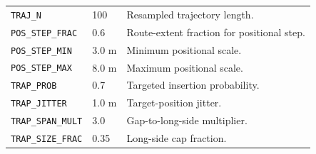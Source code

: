 \documentclass[11pt,a4paper]{report}
\newcommand{\code}[1]{\texttt{#1}}
\begin{document}
\begin{longtable}{L{4.3cm} L{2.4cm} L{7.8cm}}
\code{TRAJ\_N} & 100 & Resampled trajectory length.\\
\code{POS\_STEP\_FRAC} & 0.6 & Route-extent fraction for positional step.\\
\code{POS\_STEP\_MIN} & 3.0 m & Minimum positional scale.\\
\code{POS\_STEP\_MAX} & 8.0 m & Maximum positional scale.\\
\code{TRAP\_PROB} & 0.7 & Targeted insertion probability.\\
\code{TRAP\_JITTER} & 1.0 m & Target-position jitter.\\
\code{TRAP\_SPAN\_MULT} & 3.0 & Gap-to-long-side multiplier.\\
\code{TRAP\_SIZE\_FRAC} & 0.35 & Long-side cap fraction.\\
\bottomrule
\end{longtable}
\end{document}
